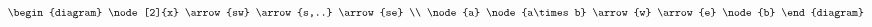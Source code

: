 \documentclass[border=1pt]{standalone}
\begin{document}
$
  \begin{diagram}
    \node[2]{x} \arrow{sw} \arrow{s,..} \arrow{se} \\
    \node{a} \node{a\times b} \arrow{w} \arrow{e} \node{b}
  \end{diagram}
$
\end{document}
